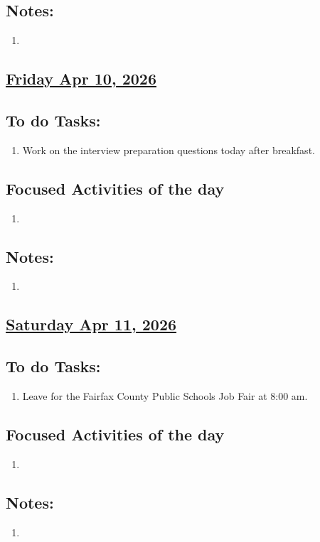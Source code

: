 \subsection*{Notes:}
\begin{enumerate}
    \item  
\end{enumerate}
\subsection*{\underline{Friday Apr 10, 2026}}
\subsection*{To do Tasks:}
\begin{enumerate}
    \item Work on the interview preparation questions today after breakfast. 
\end{enumerate}
\subsection*{Focused Activities of the day}
\begin{enumerate}[\ding{212}]  
    \item  
\end{enumerate}
\subsection*{Notes:}
\begin{enumerate}
    \item 
\end{enumerate}
\subsection*{\underline{Saturday Apr 11, 2026} }
\subsection*{To do Tasks:}
\begin{enumerate}
    \item Leave for the Fairfax County Public Schools Job Fair at 8:00 am.
\end{enumerate}
\subsection*{Focused Activities of the day}
\begin{enumerate}[\ding{212}]  
    \item 
\end{enumerate}
\subsection*{Notes:}
\begin{enumerate}
    \item 
\end{enumerate}
